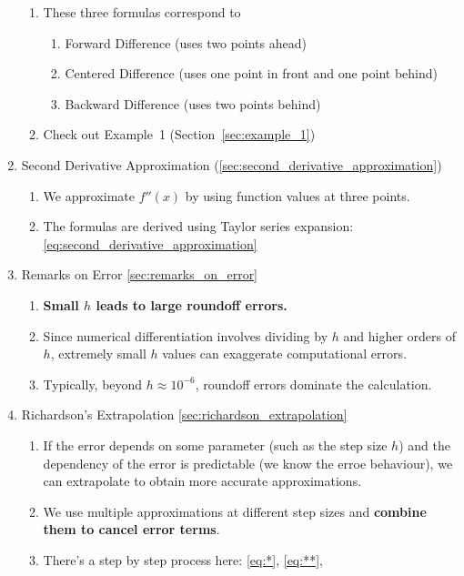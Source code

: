 \begin{enumerate}
\begin{enumerate}[label=(\alph*)]
      \item These three formulas correspond to 
        \begin{enumerate}
          \item Forward Difference (uses two points ahead)
          \item Centered Difference (uses one point in front and one point behind)
          \item Backward Difference (uses two points behind)
        \end{enumerate}
      \item Check out Example~1 (Section~\ref{sec:example_1})
    \end{enumerate}
  \item Second Derivative Approximation (\ref{sec:second_derivative_approximation})
    \begin{enumerate}[label=(\alph*)]
      \item We approximate $f''(x)$ by using function values at three points.
      \item The formulas are derived using Taylor series expansion: \eqref{eq:second_derivative_approximation}
    \end{enumerate}
  \item Remarks on Error \ref{sec:remarks_on_error}
    \begin{enumerate}[label=(\alph*)]
      \item \textbf{Small $h$ leads to large roundoff errors.}
      \item Since numerical differentiation involves dividing by $h$ and higher
        orders of $h$, extremely small $h$ values can exaggerate computational
        errors.
      \item Typically, beyond $h\approx 10^{-6}$, roundoff errors dominate the
        calculation.
    \end{enumerate}
  \item Richardson's Extrapolation \ref{sec:richardson_extrapolation}
    \begin{enumerate}[label=(\alph*)]
      \item If the error depends on some parameter (such as the step size $h$)
        and the dependency of the error is predictable (we know the erroe
        behaviour), we can extrapolate to obtain more accurate approximations.
      \item We use multiple approximations at different step sizes and
        \textbf{combine them to cancel error terms}.
      \item There's a step by step process here: \eqref{eq:*}, \eqref{eq:**},

\end{enumerate}
\end{enumerate}
